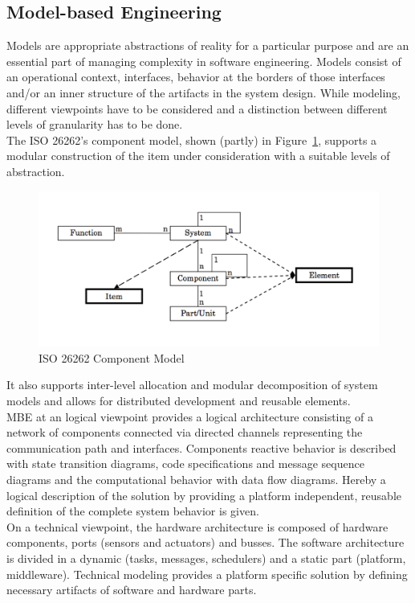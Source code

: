 \subsection{Model-based Engineering}
Models are appropriate abstractions of reality for a particular purpose and are an essential part of managing complexity in software engineering.
Models consist of an operational context, interfaces, behavior at the borders of those interfaces and/or an inner structure of the artifacts in the system design.
While modeling, different viewpoints have to be considered and a distinction between different levels of granularity has to be done.\\

The ISO 26262's component model, shown (partly) in Figure~\ref{fig:iso_component_model}, supports a modular construction of the item under consideration with a suitable levels of abstraction.
\begin{figure}[H]
  \centering
  \includegraphics[width=.8\textwidth]{images/iso_component_model.png}
  \caption{ISO 26262 Component Model}\label{fig:iso_component_model}
\end{figure}
It also supports inter-level allocation and modular decomposition of system models and allows for distributed development and reusable elements.\\

MBE at an logical viewpoint provides a logical architecture consisting of a network of components connected via directed channels representing the communication path and interfaces.
Components reactive behavior is described with state transition diagrams, code specifications and message sequence diagrams and the computational behavior with data flow diagrams.
Hereby a logical description of the solution by providing a platform independent, reusable definition of the complete system behavior is given.\\

On a technical viewpoint, the hardware architecture is composed of hardware components, ports (sensors and actuators) and busses.
The software architecture is divided in a dynamic (tasks, messages, schedulers) and a static part (platform, middleware).
Technical modeling provides a platform specific solution by defining necessary artifacts of software and hardware parts.\\


